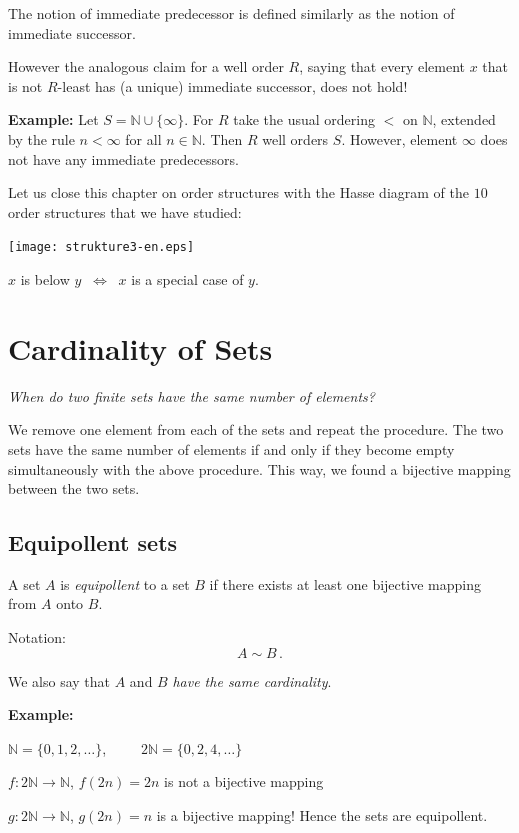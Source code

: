 \documentclass[11pt,paper=b5,footinclude,headinclude]{scrbook} %
\def\cee {{~\Leftrightarrow~}}
\theoremstyle{remark}
\theoremstyle{definition} %
\theoremstyle{theorem} %
\begin{document}
The notion of immediate predecessor is defined similarly as the
notion of immediate successor.

However the analogous claim for a well order $R$, saying that every element $x$ that is not $R$-least has (a unique) immediate successor, does not hold!

\bigskip
\textbf{ Example:}
Let $S = \mathbb{N}\cup\{\infty\}$. For $R$ take the usual ordering $<$ on $\mathbb{N}$, extended by the rule $n<\infty$ for all $n\in \mathbb{N}$.
Then $R$ well orders $S$. However, element $\infty$ does not have any immediate predecessors.

\medskip

Let us close this chapter on order structures with the Hasse diagram of the $10$ order structures that we have studied:

\begin{center}
\texttt{[image: strukture3-en.eps]}
\end{center}

$x$ is below $y$ $\cee$ $x$ is a special case of $y$.

\chapter{Cardinality of Sets}
{\em When do two finite sets have the same number of elements?

We remove one element from each of the sets and repeat the procedure.
The two sets have the same number of elements if and only if they become empty simultaneously with the above procedure.
This way, we found a bijective mapping between the two sets.}

\section{Equipollent sets}

A set $A$ is {\em equipollent} to a set $B$ if there exists at least one bijective mapping from $A$ onto $B$.

Notation: $$A\sim B\,.$$

We also say that $A$ and $B$ \emph{ have the same cardinality}.



\textbf{ Example:}

$\mathbb{N} = \{0,1,2,\ldots\}$,~~~~~$2\mathbb{N} = \{0,2,4,\ldots\}$

$f: 2\mathbb{N} \to \mathbb{N}$, $f(2n) = 2n$ is not a bijective mapping

$g: 2\mathbb{N} \to \mathbb{N}$, $g(2n) = n$ is a bijective mapping!
Hence the sets are equipollent.
\end{document}
